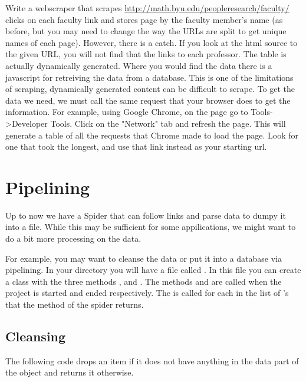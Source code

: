 \begin{problem}
Write a webscraper that scrapes \url{http://math.byu.edu/peopleresearch/faculty/} clicks on each faculty link and stores page by the faculty member's name (as before, but you may need to change the way the URLs are split to get unique names of each page). 
However, there is a catch. 
If you look at the html source to the given URL, you will not find that the links to each professor. 
The table is actually dynamically generated. 
Where you would find the data there is a javascript for retreiving the data from a database.
 This is one of the limitations of scraping, dynamically generated content can be difficult to scrape. 
To get the data we need, we must call the same request that your browser does to get the information. 
For example, using Google Chrome, on the page go to Tools->Developer Tools. Click on the "Network" tab and refresh the page. 
This will generate a table of all the requests that Chrome made to load the page. 
Look for one that took the longest, and use that link instead as your starting url. 
\end{problem}

\section*{Pipelining}
Up to now we have a Spider that can follow links and parse data to dumpy it into a  file. 
While this may be sufficient for some appilications, we might want to do a bit more processing on the data.

For example, you may want to cleanse the data or put it into a database via pipelining. 
In your directory  you will have a file called . 
In this file you can create a class with the three methods ,  and . The methods  and  are called when the project is started and ended respectively. The  is called for each  in the list of 's that the  method of the spider returns.

\subsection*{Cleansing}

The following code drops an item if it does not have anything in the data part of the object and returns it otherwise.

